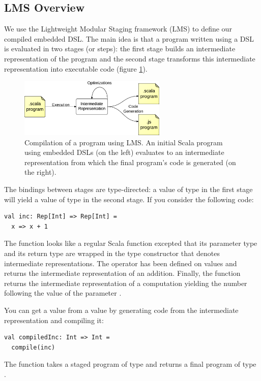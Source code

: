 \documentclass[runningheads,a4paper]{llncs}
\begin{document}

\subsection{LMS Overview}

We use the Lightweight Modular Staging framework (LMS) to define our compiled embedded DSL. The main idea is that a
program written using a DSL is evaluated in two stages (or steps): the first stage builds an intermediate
representation of the program and the second stage transforms this intermediate representation into executable code
(figure \ref{lms-diagram}).

\begin{figure}
  \centering
  \includegraphics[width=7cm]{lms.pdf}
  \caption{Compilation of a program using LMS. An initial Scala program using embedded DSLs (on the left) evaluates
  to an intermediate representation from which the final program’s code is generated (on the right).}
  \label{lms-diagram}
\end{figure}

The bindings between stages are type-directed: a value of type  in the first stage will yield a value
of type  in the second stage. If you consider the following code:
\begin{lstlisting}
val inc: Rep[Int] => Rep[Int] =
  x => x + 1
\end{lstlisting}
The function looks like
a regular Scala function excepted that its parameter type and its return type are wrapped in the  type
constructor that denotes intermediate representations. The \code{+} operator has been defined on 
values and returns the intermediate representation of an addition. Finally, the  function returns the
intermediate representation of a computation yielding the number following the value of the parameter .

You can get a  value from a  value by generating code from the intermediate representation and
compiling it:
\begin{lstlisting}
val compiledInc: Int => Int =
  compile(inc)
\end{lstlisting}
The  function takes a staged program of type  and returns a final program of
type .
\end{document}
